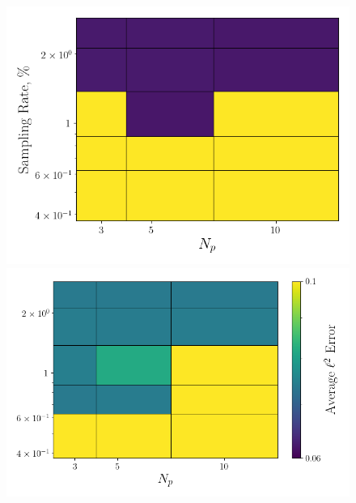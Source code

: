 \begin{figure}
	\begin{minipage}{0.46\linewidth}
		\includegraphics[width=0.99\linewidth]{Chapters/AdaptiveResults/Images/cvrc/errContours/err_contour_iter2.png}
	\end{minipage}
	\begin{minipage}{0.53\linewidth}
		\includegraphics[width=0.99\linewidth]{Chapters/AdaptiveResults/Images/cvrc/errContours/err_contour_iter3.png}
	\end{minipage}


\end{figure}
